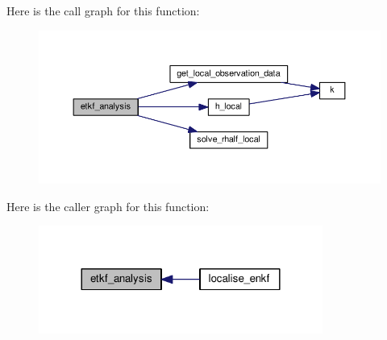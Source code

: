 Here is the call graph for this function\-:\nopagebreak
\begin{figure}[H]
\begin{center}
\leavevmode
\includegraphics[width=350pt]{etkf__analysis_8f90_a7a1f0166706aef6167aad6525c792f66_cgraph}
\end{center}
\end{figure}




Here is the caller graph for this function\-:\nopagebreak
\begin{figure}[H]
\begin{center}
\leavevmode
\includegraphics[width=264pt]{etkf__analysis_8f90_a7a1f0166706aef6167aad6525c792f66_icgraph}
\end{center}
\end{figure}


